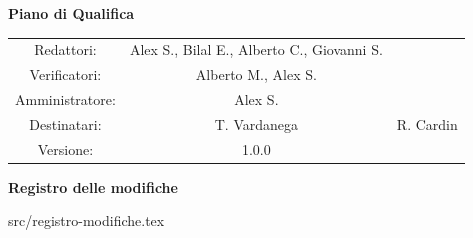 \documentclass[a4paper, 11pt]{article}
\begin{document}
\begin{center}
\begin{Huge}
        \textbf{Piano di Qualifica} \\
        \vspace{4mm}

\end{Huge}

\vspace{20mm}

\begin{large}
\begin{spacing}{1.4}
\begin{tabular}{c c c}
   Redattori: & Alex S., Bilal E., Alberto C., Giovanni S. & \\
   Verificatori: & Alberto M., Alex S. & \\
   Amministratore: & Alex S. & \\
   Destinatari: & T. Vardanega & R. Cardin \\
   Versione: & 1.0.0 &
\end{tabular}
\end{spacing}
\end{large}
\end{center}

\pagebreak

\begin{huge}
    \textbf{Registro delle modifiche}
\end{huge}
\vspace{5pt}

 {src/registro-modifiche.tex}

\pagebreak
\tableofcontents
\pagebreak










\end{document}
